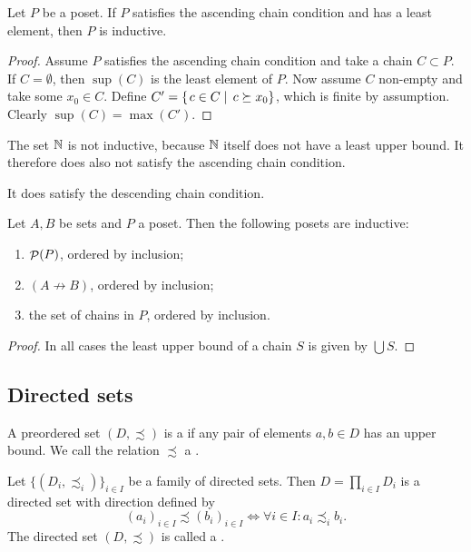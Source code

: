 \begin{lemma}
Let $P$ be a poset. If $P$ satisfies the ascending chain condition and has a least element, then $P$ is inductive.
\end{lemma}
\begin{proof}
Assume $P$ satisfies the ascending chain condition and take a chain $C\subset P$. If $C=\emptyset$, then $\sup(C)$ is the least element of $P$. Now assume $C$ non-empty and take some $x_0\in C$. Define $C' = \left\{\left. c\in C \;\right|\; c\succeq x_0 \right\}$, which is finite by assumption. Clearly $\sup(C) = \max(C')$.
\end{proof}

\begin{example}
The set $\mathbb{N}$ is not inductive, because $\mathbb{N}$ itself does not have a least upper bound. It therefore does also not satisfy the ascending chain condition.

It does satisfy the descending chain condition.
\end{example}


\begin{proposition} \label{prop:inductive}
Let $A,B$ be sets and $P$ a poset. Then the following posets are inductive:
\begin{enumerate}
\item $\mathop{\mathcal{P}}(P)$, ordered by inclusion;
\item $(A \not\to B)$, ordered by inclusion;
\item the set of chains in $P$, ordered by inclusion.
\end{enumerate}
\end{proposition}
\begin{proof}
In all cases the least upper bound of a chain $S$ is given by $\bigcup S$.
\end{proof}

\subsection{Directed sets}
\begin{definition}
A preordered set $(D,\precsim)$ is a  if any pair of elements $a,b\in D$ has an upper bound. We call the relation $\precsim$ a .
\end{definition}
\begin{proposition}
Let $\{(D_i,\precsim_i)\}_{i\in I}$ be a family of directed sets. Then $D= \prod_{i\in I}D_i$ is a directed set with direction defined by
\[ (a_i)_{i\in I} \precsim (b_i)_{i\in I} \iff \forall i\in I: a_i\precsim_i b_i. \]
The directed set $(D,\precsim)$ is called a .
\end{proposition}

